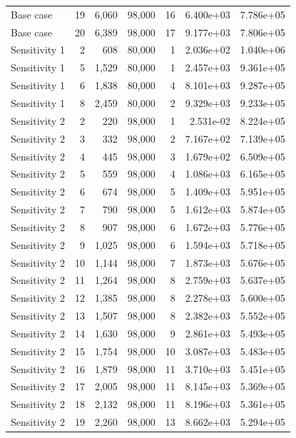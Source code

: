 \begin{table}[]
\begin{tabular}{lrrrrrr}
  Base case & 19 & 6,060 &  98,000 &   16 & 6.400e+03 & 7.786e+05 \\
  Base case & 20 & 6,389 &  98,000 &   17 & 9.177e+03 & 7.806e+05 \\
 Sensitivity 1 & 2 & 608 &  80,000 &   1 & 2.036e+02 & 1.040e+06 \\
 Sensitivity 1 & 5 & 1,529 &  80,000 &   1 & 2.457e+03 & 9.361e+05 \\
 Sensitivity 1 & 6 & 1,838 &  80,000 &   4 & 8.101e+03 & 9.287e+05 \\
 Sensitivity 1 & 8 & 2,459 &  80,000 &   2 & 9.329e+03 & 9.233e+05 \\
 Sensitivity 2 & 2 & 220 &  98,000 &   1 & 2.531e-02 & 8.224e+05 \\
 Sensitivity 2 & 3 & 332 &  98,000 &   2 & 7.167e+02 & 7.139e+05 \\
 Sensitivity 2 & 4 & 445 &  98,000 &   3 & 1.679e+02 & 6.509e+05 \\
 Sensitivity 2 & 5 & 559 &  98,000 &   4 & 1.086e+03 & 6.165e+05 \\
 Sensitivity 2 & 6 & 674 &  98,000 &   5 & 1.409e+03 & 5.951e+05 \\
 Sensitivity 2 & 7 & 790 &  98,000 &   5 & 1.612e+03 & 5.874e+05 \\
 Sensitivity 2 & 8 & 907 &  98,000 &   6 & 1.672e+03 & 5.776e+05 \\
 Sensitivity 2 & 9 & 1,025 &  98,000 &   6 & 1.594e+03 & 5.718e+05 \\
 Sensitivity 2 & 10 & 1,144 &  98,000 &   7 & 1.873e+03 & 5.676e+05 \\
 Sensitivity 2 & 11 & 1,264 &  98,000 &   8 & 2.759e+03 & 5.637e+05 \\
 Sensitivity 2 & 12 & 1,385 &  98,000 &   8 & 2.278e+03 & 5.600e+05 \\
 Sensitivity 2 & 13 & 1,507 &  98,000 &   8 & 2.382e+03 & 5.552e+05 \\
 Sensitivity 2 & 14 & 1,630 &  98,000 &   9 & 2.861e+03 & 5.493e+05 \\
 Sensitivity 2 & 15 & 1,754 &  98,000 &   10 & 3.087e+03 & 5.483e+05 \\
 Sensitivity 2 & 16 & 1,879 &  98,000 &   11 & 3.710e+03 & 5.451e+05 \\
 Sensitivity 2 & 17 & 2,005 &  98,000 &   11 & 8.145e+03 & 5.369e+05 \\
 Sensitivity 2 & 18 & 2,132 &  98,000 &   11 & 8.196e+03 & 5.361e+05 \\
 Sensitivity 2 & 19 & 2,260 &  98,000 &   13 & 8.662e+03 & 5.294e+05 \\

\end{tabular}
\end{table}
